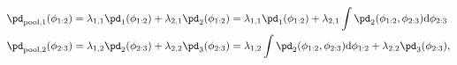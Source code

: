\begin{align}
  \pd_{\text{pool}, 1}(\phi_{1:2}) &= \lambda_{1, 1}\pd_{1}(\phi_{1:2}) + \lambda_{2, 1}\pd_{2}(\phi_{1:2}) = \lambda_{1, 1}\pd_{1}(\phi_{1:2}) + \lambda_{2, 1}\int\pd_{2}(\phi_{1:2}, \phi_{2:3}) \text{d}\phi_{2:3} \\
  \pd_{\text{pool}, 2}(\phi_{2:3}) &= \lambda_{1, 2}\pd_{2}(\phi_{2:3}) + \lambda_{2, 2}\pd_{3}(\phi_{2:3}) = \lambda_{1, 2}\int\pd_{2}(\phi_{1:2}, \phi_{2:3})\text{d}\phi_{1:2} + \lambda_{2, 2}\pd_{3}(\phi_{2:3}),
\end{align}